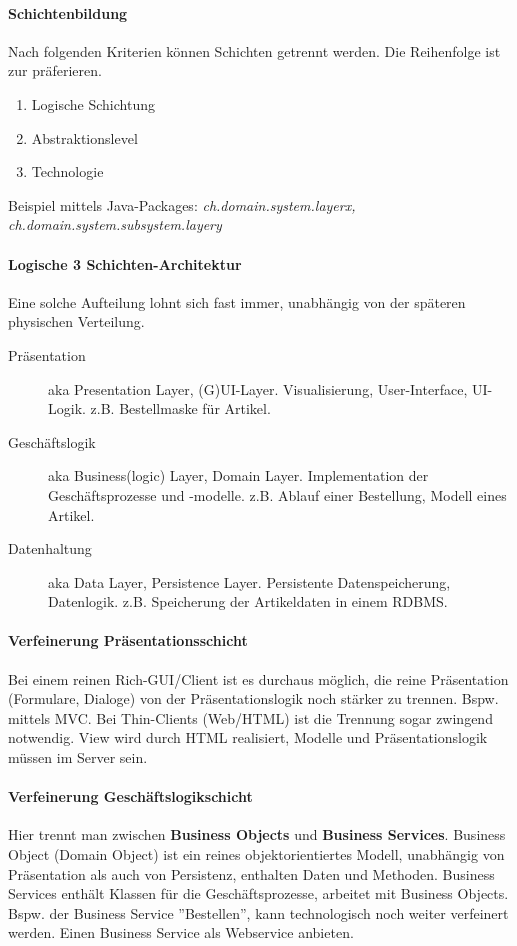 \paragraph{Schichtenbildung} Nach folgenden Kriterien können Schichten getrennt werden. Die Reihenfolge ist zur präferieren.
\begin{enumerate}
	\item Logische Schichtung
	\item Abstraktionslevel
	\item Technologie
\end{enumerate}
	
Beispiel mittels Java-Packages:
\textit{ch.domain.system.layerx, ch.domain.system.subsystem.layery}

\paragraph{Logische 3 Schichten-Architektur} Eine solche Aufteilung lohnt sich fast immer, unabhängig von der späteren physischen Verteilung.
\begin{description}
	\item[Präsentation] aka Presentation Layer, (G)UI-Layer. Visualisierung, User-Interface, UI-Logik. z.B. Bestellmaske für Artikel.
	\item[Geschäftslogik] aka Business(logic) Layer, Domain Layer. Implementation der Geschäftsprozesse und -modelle. z.B. Ablauf einer Bestellung, Modell eines Artikel.
	\item[Datenhaltung] aka Data Layer, Persistence Layer. Persistente Datenspeicherung, Datenlogik. z.B. Speicherung der Artikeldaten in einem RDBMS.
\end{description}

\paragraph{Verfeinerung Präsentationsschicht} Bei einem reinen Rich-GUI/Client ist es durchaus möglich, die reine Präsentation (Formulare, Dialoge) von der Präsentationslogik noch stärker zu trennen. Bspw. mittels MVC. Bei Thin-Clients (Web/HTML) ist die Trennung sogar zwingend notwendig. View wird durch HTML realisiert, Modelle und Präsentationslogik müssen im Server sein.

\paragraph{Verfeinerung Geschäftslogikschicht} Hier trennt man zwischen \textbf{Business Objects} und \textbf{Business Services}. Business Object (Domain Object) ist ein reines objektorientiertes Modell, unabhängig von Präsentation als auch von Persistenz, enthalten Daten und Methoden. Business Services enthält Klassen für die Geschäftsprozesse, arbeitet mit Business Objects. Bspw. der Business Service ''Bestellen'', kann technologisch noch weiter verfeinert werden. Einen Business Service als Webservice anbieten.


